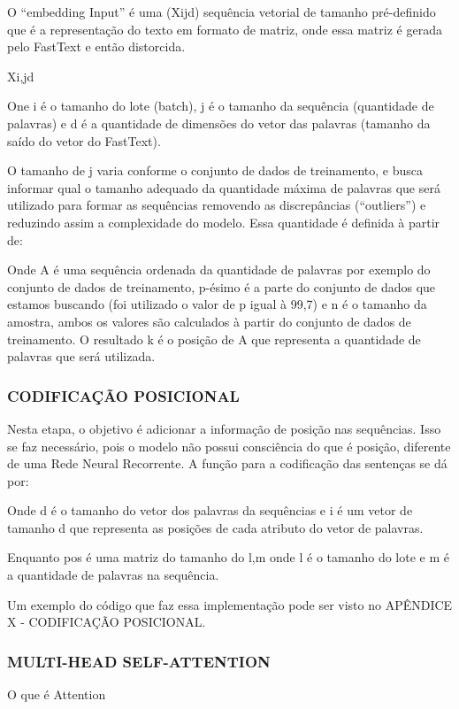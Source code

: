 O “embedding Input” é uma (Xijd) sequência vetorial de tamanho pré-definido que é a representação do texto em formato de matriz, onde essa matriz é gerada pelo FastText e então distorcida.

Xi,jd

One i é o tamanho do lote (batch), j é o tamanho da sequência (quantidade de palavras) e d é a quantidade de dimensões do vetor das palavras (tamanho da saído do vetor do FastText). 

O tamanho de j varia conforme o conjunto de dados de treinamento, e busca informar qual o tamanho adequado da quantidade máxima de palavras que será utilizado para formar as sequências removendo as discrepâncias (“outliers”) e reduzindo assim a complexidade do modelo. Essa quantidade é definida à partir de:


Onde A é uma sequência ordenada da quantidade de palavras por exemplo do conjunto de dados de treinamento,  p-ésimo é a parte  do conjunto de dados que estamos buscando (foi utilizado o valor de p igual à 99,7) e n é o tamanho da amostra, ambos os valores são calculados à partir do conjunto de dados de treinamento. O resultado k é o posição de A que representa a quantidade de palavras que será utilizada.

\subsubsection{CODIFICAÇÃO POSICIONAL}

Nesta etapa, o objetivo é adicionar a informação de posição nas sequências. Isso se faz necessário, pois o modelo não possui consciência do que é posição, diferente de uma Rede Neural Recorrente. A função para a codificação das sentenças se dá por:

Onde d é o tamanho do vetor dos palavras da sequências e i é um vetor de tamanho d que representa as posições de cada atributo do vetor de palavras.

Enquanto pos é uma matriz do tamanho do l,m onde l é o tamanho do lote e m é a quantidade de palavras na sequência.

Um exemplo do código que faz essa implementação pode ser visto no APÊNDICE X - CODIFICAÇÃO POSICIONAL.

\subsubsection{MULTI-HEAD SELF-ATTENTION}
O que é Attention

